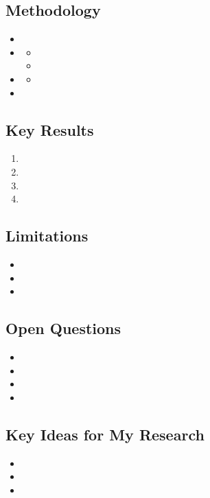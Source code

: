 \documentclass[12pt,a4paper]{article}
\begin{document}
\subsection*{Methodology}
\begin{itemize}
    \item 
    \item 
    \begin{itemize}
        \item 
        \item
    \end{itemize}
    \item
    \begin{itemize}
        \item 
    \end{itemize}
    \item 
\end{itemize}

\subsection*{Key Results}
\begin{enumerate}
    \item 
    \item 
    \item
    \item 
\end{enumerate}

\subsection*{Limitations}
\begin{itemize}
    \item 
    \item 
    \item 
\end{itemize}

\subsection*{Open Questions}
\begin{itemize}
    \item 
    \item 
    \item 
    \item 
\end{itemize}

\subsection*{Key Ideas for My Research}
\label{subsec:relevance2}
\begin{itemize}
    \item
    \item 
    \item  
\end{itemize}
\end{document}
